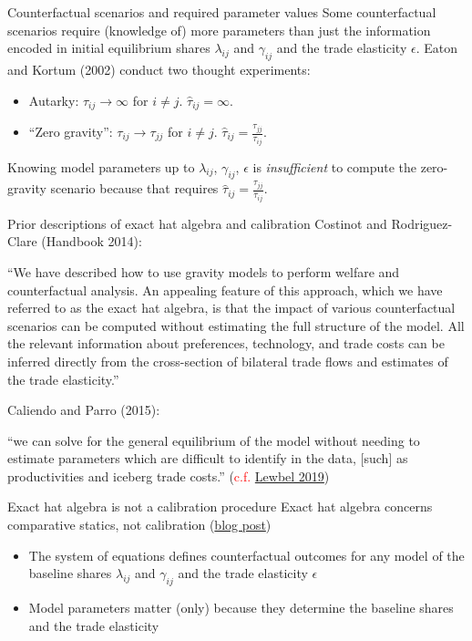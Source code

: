 \documentclass[11pt,notes=hide,aspectratio=169]{beamer}
\begin{document}
\begin{frame}{Counterfactual scenarios and required parameter values}
Some counterfactual scenarios require (knowledge of) more parameters than
just the information encoded in 
initial equilibrium shares $\lambda_{ij}$ and $\gamma_{ij}$ and
the trade elasticity $\epsilon$.
Eaton and Kortum (2002) conduct two thought experiments:
\begin{itemize}
\item Autarky: $\tau_{ij} \to \infty$ for $i \neq j$. $\hat{\tau}_{ij} = \infty$.
\item ``Zero gravity'': $\tau_{ij} \to \tau_{jj}$ for $i \neq j$. $\hat{\tau}_{ij} = \frac{\tau_{jj}}{\tau_{ij}}$.
\end{itemize}
Knowing model parameters up to $\lambda_{ij}$, $\gamma_{ij}$, $\epsilon$
is \textit{insufficient} to compute the zero-gravity scenario
because that requires $\hat{\tau}_{ij} = \frac{\tau_{jj}}{\tau_{ij}}$.
\end{frame}
\begin{frame}{Prior descriptions of exact hat algebra and calibration}
Costinot and Rodriguez-Clare (Handbook 2014):\\
{\small
``We have described how to use gravity models to perform welfare and counterfactual analysis. An appealing feature of this approach, which we have referred to as the exact hat algebra, is that the impact of various counterfactual scenarios can be computed without estimating the full structure of the model. All the relevant information about preferences, technology, and trade costs can be inferred directly from the cross-section of bilateral trade flows and estimates of the trade elasticity.''
\par}
\vspace{3mm}
Caliendo and Parro (2015):\\
{\small
``we can solve for the general equilibrium of the model without needing to estimate parameters which are difficult to identify in the data, [such] as productivities and iceberg trade costs.''
(\textcolor{red}{c.f.} \href{https://www.aeaweb.org/articles?id=10.1257/jel.20181361}{Lewbel 2019})
\par}
\end{frame}
\begin{frame}{Exact hat algebra is not a calibration procedure}
Exact hat algebra concerns comparative statics, not calibration (\href{https://tradediversion.net/2023/10/02/exact-hat-algebra-concerns-comparative-statics-not-calibration/}{blog post})
\begin{itemize}
\item The system of equations defines counterfactual outcomes for any model of the baseline shares $\lambda_{ij}$ and $\gamma_{ij}$ and the trade elasticity $\epsilon$
\item Model parameters matter (only) because they determine the baseline shares and the trade elasticity
\end{itemize}
\end{frame}
\end{document}

